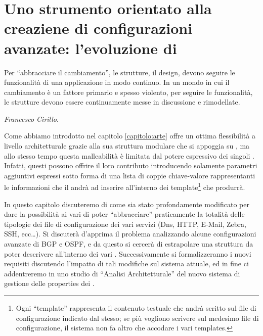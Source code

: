 \chapter{Uno strumento orientato alla creaziene di configurazioni avanzate: l'evoluzione di \visualnetkit{}}\label{capitolo:evoluzione_visualnetkit}

\begin{flushright}
\begin{footnotesize}
Per ``abbracciare il cambiamento'', le strutture, il design, devono seguire le funzionalità di una applicazione in modo continuo. In un mondo in cui il cambiamento è un fattore primario e spesso violento, per seguire le funzionalità, le strutture devono essere continuamente messe in discussione e rimodellate.\\
\end{footnotesize}
\begin{footnotesize}
\textit{Francesco Cirillo}.
\end{footnotesize}
\end{flushright}

Come abbiamo introdotto nel capitolo \ref{capitolo:arte} \visualnetkit{} offre un ottima flessibilità a livello architetturale grazie alla sua struttura modulare che si appoggia su \plugin{}, ma allo stesso tempo questa malleabilità è limitata dal potere espressivo dei singoli \plugin{}. Infatti, questi possono offrire il loro contributo introducendo solamente parametri aggiuntivi espressi sotto forma di una lista di coppie chiave-valore rappresentanti le informazioni che il \plugin{} andrà ad inserire all'interno dei template\footnote{Ogni ``template'' rappresenta il contenuto testuale che andrà scritto sul file di configurazione indicato dal \plugin{} stesso; se più \plugin{} vogliono scrivere sul medesimo file di configurazione, il sistema non fa altro che accodare i vari templates.} che produrrà.

In questo capitolo discuteremo di come \visualnetkit{} sia stato profondamente modificato per dare la possibilità ai vari \plugin{} di poter ``abbracciare'' praticamente la totalità delle tipologie dei file di configurazione dei vari servizi (Dns, HTTP, E-Mail, Zebra, SSH, ecc\ldots). Si discuterà d'apprima il problema analizzando alcune configurazioni avanzate di BGP e OSPF, e da questo si cercerà di estrapolare una struttura da poter descrivere all'interno dei vari \plugin{}. Successivamente si formalizzeranno i nuovi requisiti discutendo l'impatto di tali modifiche sul sistema attuale, ed in fine ci addentreremo in uno studio di ``Analisi Architetturale'' del nuovo sistema di gestione delle properties dei \plugin{}.


